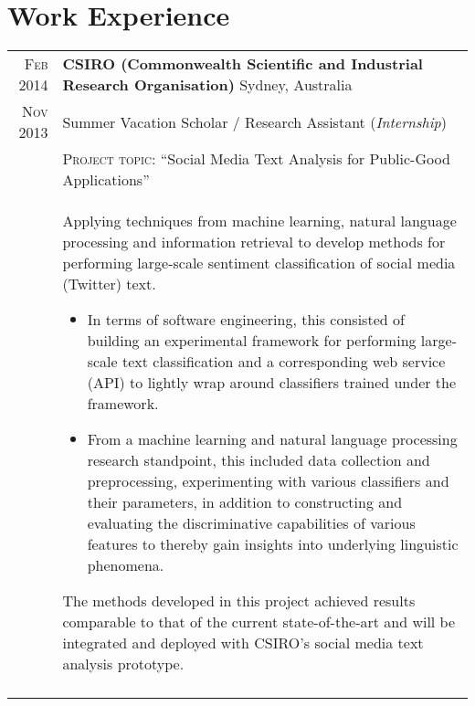 \documentclass[a4paper,10pt]{article} %
\begin{document}

\section{Work Experience}

\begin{longtable}{r|p{13.8cm}}
  \textsc{Feb 2014}	& \textbf{CSIRO {\small (Commonwealth Scientific and Industrial 
    Research Organisation)}} 
    \hfill Sydney, Australia \\
  \textsc{Nov 2013} & Summer Vacation Scholar / Research Assistant 
    \hfill (\emph{Internship}) \\
  & {\small \textsc{Project topic}: ``Social Media Text Analysis for 
      Public-Good Applications''}\\
  & {\footnotesize
      Applying techniques from machine learning, natural language processing 
      and information retrieval to develop methods for performing large-scale 
      sentiment classification of social media (Twitter) text.
      \begin{itemize}
        \item In terms of software engineering, this consisted of building an 
        experimental framework for performing large-scale text classification 
        and a corresponding web service (API) to lightly wrap around classifiers 
        trained under the framework.
        \item From a machine learning and natural language processing research 
        standpoint, this included data collection and preprocessing, experimenting 
        with various classifiers and their parameters, in addition to constructing 
        and evaluating the discriminative capabilities of various features to thereby 
        gain insights into underlying linguistic phenomena.
      \end{itemize}
      The methods developed in this project achieved results comparable to that of 
      the current state-of-the-art and will be integrated and deployed with CSIRO's 
      social media text analysis prototype.
    }\\
				
  \multicolumn{2}{c}{}\\


\end{longtable}
\end{document}
